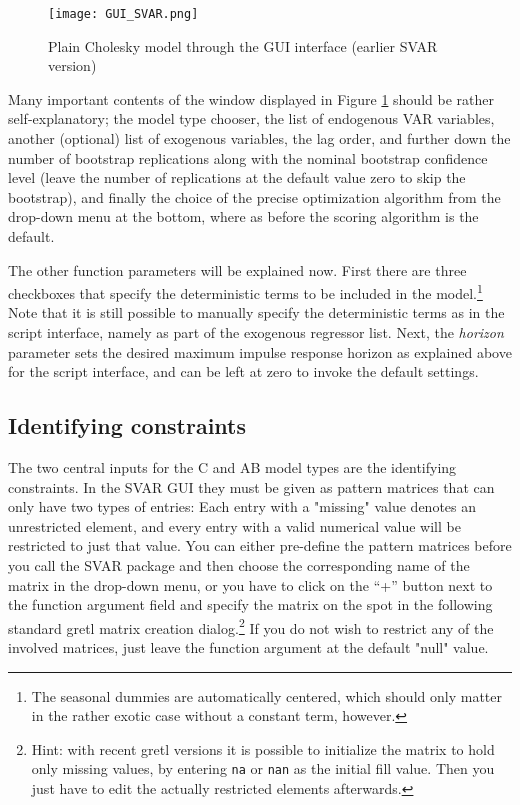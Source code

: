 \documentclass[a4paper,10pt]{article}
\newcommand{\app}[1]{\textsf{#1}}
\newcounter{script}[section]
\begin{document}
\begin{figure}[htbp]
  \centering
  \texttt{[image: GUI\_SVAR.png]}
  \caption{Plain Cholesky model through the GUI interface (earlier SVAR version)}
  \label{fig:GUI-plain}
\end{figure}


Many important contents of the window displayed in Figure
\ref{fig:GUI-plain} should be rather self-explanatory; the model type
chooser, the list of endogenous VAR variables, another (optional) list
of exogenous variables, the lag order, and further down the number of
bootstrap replications along with the nominal bootstrap confidence
level (leave the number of replications at the default value zero to
skip the bootstrap), and finally the choice of the precise
optimization algorithm from the drop-down menu at the bottom, where as
before the scoring algorithm is the default.

The other function parameters will be explained now. First there are
three checkboxes that specify the deterministic terms to be included
in the model.\footnote{The seasonal dummies are automatically
  centered, which should only matter in the rather exotic case without
  a constant term, however.} Note that it is still possible to
manually specify the deterministic terms as in the script interface,
namely as part of the exogenous regressor list. Next, the
\emph{horizon} parameter sets the desired maximum impulse response
horizon as explained above for the script interface, and can be left
at zero to invoke the default settings.

\subsection{Identifying constraints}

The two central inputs for the C and AB model types are the
identifying constraints. In the SVAR GUI they must be given as pattern
matrices that can only have two types of entries: Each entry with a
"missing" value denotes an unrestricted element, and every entry with
a valid numerical value will be restricted to just that value. You can
either pre-define the pattern matrices before you call the SVAR
package and then choose the corresponding name of the matrix in the
drop-down menu, or you have to click on the ``+'' button next to the
function argument field and specify the matrix on the spot in the
following standard \app{gretl} matrix creation dialog.\footnote{Hint:
  with recent gretl versions it is possible to initialize the matrix
  to hold only missing values, by entering \texttt{na} or \texttt{nan}
  as the initial fill value. Then you just have to edit the actually
  restricted elements afterwards.} If you do not wish to restrict any
of the involved matrices, just leave the function argument at the
default "null" value.
\end{document}
